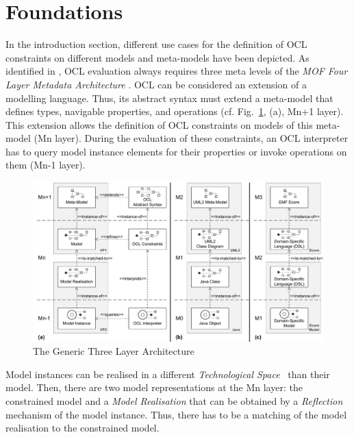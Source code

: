 \section{Foundations}
\label{sec:foundation}

In the introduction section, different use cases for the definition of OCL constraints on different
models and meta-models have been depicted. As identified in \cite{demuthRGWS09}, OCL evaluation
always requires three meta levels of the \emph{MOF Four Layer Metadata Architecture} \cite{spec:MOF1-4}. OCL can 
be considered an extension of a modelling language. Thus, its
abstract syntax must extend a meta-model that defines types, navigable properties, and operations
(cf. Fig.~\ref{fig:genericlayers}, (a), Mn+1 layer). This extension allows the definition of
OCL constraints on models of this meta-model (Mn layer). 
During the evaluation of these constraints, an OCL interpreter has to query model
instance elements for their properties or invoke operations on them (Mn-1 layer). 

	\begin{figure}[t]
			\centering
				\includegraphics[width=1.00\textwidth]{figures/genericlayers.pdf}
			\caption{The Generic Three Layer Architecture}
			\label{fig:genericlayers}
		\end{figure}

Model instances can be realised in
a different \emph{Technological Space}~\cite{kurtev2002technological} than their model. Then, there are two model
representations at the Mn layer: the constrained model and a \emph{Model Realisation} that can be obtained by a
\emph{Reflection} \cite{smith1982procedural} mechanism of the 
model instance. Thus, there has to be a matching of the model realisation to the constrained model.

